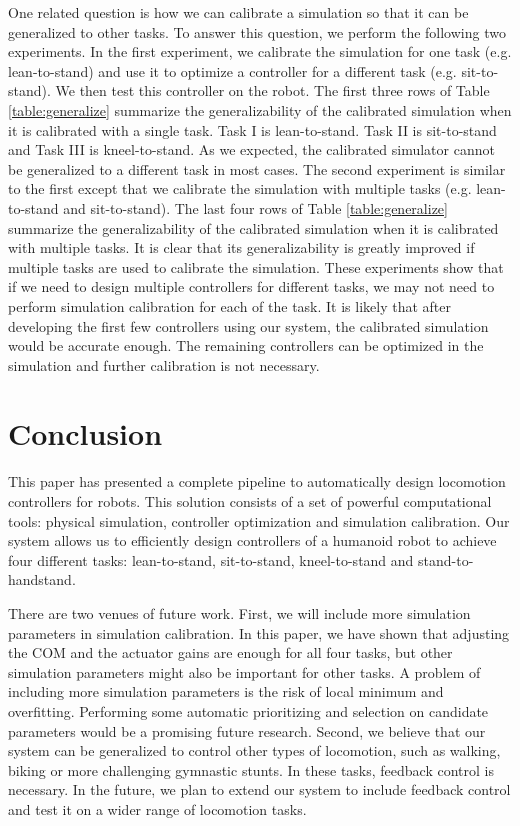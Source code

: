 One related question is how we can calibrate a simulation so that it can be generalized to other tasks. To answer this question, we perform the following two experiments. In the first experiment, we calibrate the simulation for one task (e.g. lean-to-stand) and use it to optimize a controller for a different task (e.g. sit-to-stand). We then test this controller on the robot. The first three rows of Table \ref{table:generalize} summarize the generalizability of the calibrated simulation when it is calibrated with a single task. Task I is lean-to-stand. Task II is sit-to-stand and Task III is kneel-to-stand. As we expected, the calibrated simulator cannot be generalized to a different task in most cases. The second experiment is similar to the first except that we calibrate the simulation with multiple tasks (e.g. lean-to-stand and sit-to-stand). The last four rows of Table \ref{table:generalize} summarize the generalizability of the calibrated simulation when it is calibrated with multiple tasks. It is clear that its generalizability is greatly improved if multiple tasks are used to calibrate the simulation. These experiments show that if we need to design multiple controllers for different tasks, we may not need to perform simulation calibration for each of the task. It is likely that after developing the first few controllers using our system, the calibrated simulation would be accurate enough. The remaining controllers can be optimized in the simulation and further calibration is not necessary.

\section{Conclusion}

This paper has presented a complete pipeline to automatically design locomotion controllers for robots. This solution consists of a set of powerful computational tools: physical simulation, controller optimization and simulation calibration. Our system allows us to efficiently design controllers of a humanoid robot to achieve four different tasks: lean-to-stand, sit-to-stand, kneel-to-stand and stand-to-handstand.

There are two venues of future work. First, we will include more simulation parameters in simulation calibration. In this paper, we have shown that adjusting the COM and the actuator gains are enough for all four tasks, but other simulation parameters might also be important for other tasks. A problem of including more simulation parameters is the risk of local minimum and overfitting. Performing some automatic prioritizing and selection on candidate parameters would be a promising future research. Second, we believe that our system can be generalized to control other types of locomotion, such as walking, biking or more challenging gymnastic stunts. In these tasks, feedback control is necessary. In the future, we plan to extend our system to include feedback control and test it on a wider range of locomotion tasks.
